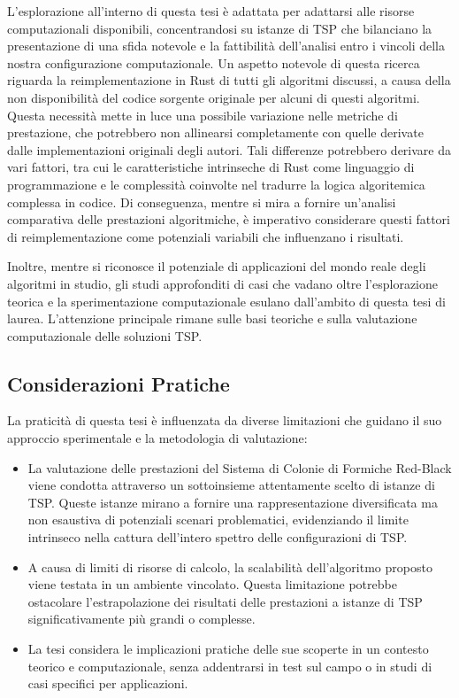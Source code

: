 L'esplorazione all'interno di questa tesi è adattata per adattarsi alle risorse computazionali disponibili, concentrandosi su istanze di \gls{TSP} che bilanciano la presentazione di una sfida notevole e la fattibilità dell'analisi entro i vincoli della nostra configurazione computazionale. Un aspetto notevole di questa ricerca riguarda la reimplementazione in Rust di tutti gli algoritmi discussi, a causa della non disponibilità del codice sorgente originale per alcuni di questi algoritmi. Questa necessità mette in luce una possibile variazione nelle metriche di prestazione, che potrebbero non allinearsi completamente con quelle derivate dalle implementazioni originali degli autori. Tali differenze potrebbero derivare da vari fattori, tra cui le caratteristiche intrinseche di Rust come linguaggio di programmazione e le complessità coinvolte nel tradurre la logica algoritemica complessa in codice. Di conseguenza, mentre si mira a fornire un'analisi comparativa delle prestazioni algoritmiche, è imperativo considerare questi fattori di reimplementazione come potenziali variabili che influenzano i risultati.

Inoltre, mentre si riconosce il potenziale di applicazioni del mondo reale degli algoritmi in studio, gli studi approfonditi di casi che vadano oltre l'esplorazione teorica e la sperimentazione computazionale esulano dall'ambito di questa tesi di laurea. L'attenzione principale rimane sulle basi teoriche e sulla valutazione computazionale delle soluzioni \gls{TSP}.

\subsection{Considerazioni Pratiche}

La praticità di questa tesi è influenzata da diverse limitazioni che guidano il suo approccio sperimentale e la metodologia di valutazione:

\begin{itemize}
	\item La valutazione delle prestazioni del Sistema di Colonie di Formiche Red-Black viene condotta attraverso un sottoinsieme attentamente scelto di istanze di \gls{TSP}.  Queste istanze mirano a fornire una rappresentazione diversificata ma non esaustiva di potenziali scenari problematici, evidenziando il limite intrinseco nella cattura dell'intero spettro delle configurazioni di \gls{TSP}.
	\item A causa di limiti di risorse di calcolo, la scalabilità dell'algoritmo proposto viene testata in un ambiente vincolato. Questa limitazione potrebbe ostacolare l'estrapolazione dei risultati delle prestazioni a istanze di \gls{TSP} significativamente più grandi o complesse.
	\item La tesi considera le implicazioni pratiche delle sue scoperte in un contesto teorico e computazionale, senza addentrarsi in test sul campo o in studi di casi specifici per applicazioni.
\end{itemize}

